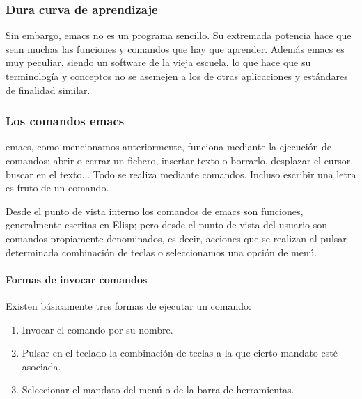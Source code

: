 \documentclass[a4paper, 11pt, titlepage]{book}
\begin{document}
            \subsubsection{Dura curva de aprendizaje} Sin embargo, emacs no es un programa sencillo.
            Su extremada potencia hace que sean muchas las funciones y comandos que hay que aprender.
            Además emacs es muy peculiar, siendo un software de la vieja escuela, lo que hace que 
            su terminología y conceptos no se asemejen a los de otras aplicaciones y estándares de 
            finalidad similar.

            \subsubsection{Los comandos emacs} emacs, como mencionamos anteriormente, 
            funciona mediante la ejecución de comandos: abrir o cerrar un fichero, insertar 
            texto o borrarlo, desplazar el cursor, buscar en el texto... Todo se realiza 
            mediante comandos. Incluso escribir una letra es fruto de un comando.

            Desde el punto de vista interno los comandos de emacs son funciones, generalmente 
            escritas en Elisp; pero desde el punto de vista del usuario son comandos propiamente 
            denominados, es decir, acciones que se realizan al pulsar determinada combinación de 
            teclas o seleccionamos una opción de menú.

            \paragraph{Formas de invocar comandos} Existen básicamente tres formas de ejecutar 
            un comando:
            
            \begin{enumerate}
                \item Invocar el comando por su nombre.
                \item Pulsar en el teclado la combinación de teclas a la que cierto mandato esté 
                asociada.
                \item Seleccionar el mandato del menú o de la barra de herramientas.
            \end{enumerate}

            
\end{document}
